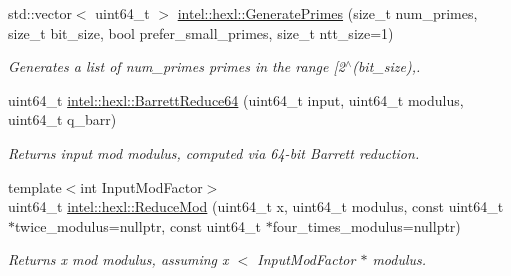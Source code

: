 \begin{DoxyCompactItemize}
std\+::vector$<$ uint64\+\_\+t $>$ \hyperlink{namespaceintel_1_1hexl_a3a8c240e5282f1d89c281527a842ae3d}{intel\+::hexl\+::\+Generate\+Primes} (size\+\_\+t num\+\_\+primes, size\+\_\+t bit\+\_\+size, bool prefer\+\_\+small\+\_\+primes, size\+\_\+t ntt\+\_\+size=1)
\begin{DoxyCompactList}\small\item\em Generates a list of num\+\_\+primes primes in the range \mbox{[}2$^\wedge$(bit\+\_\+size),. \end{DoxyCompactList}\item 
uint64\+\_\+t \hyperlink{namespaceintel_1_1hexl_aebdaa3e2bf7c73ec0dacd465c69f2969}{intel\+::hexl\+::\+Barrett\+Reduce64} (uint64\+\_\+t input, uint64\+\_\+t modulus, uint64\+\_\+t q\+\_\+barr)
\begin{DoxyCompactList}\small\item\em Returns input mod modulus, computed via 64-\/bit Barrett reduction. \end{DoxyCompactList}\item 
{\footnotesize template$<$int Input\+Mod\+Factor$>$ }\\uint64\+\_\+t \hyperlink{namespaceintel_1_1hexl_ab716e0395cbfe58e76f866a9044f2a62}{intel\+::hexl\+::\+Reduce\+Mod} (uint64\+\_\+t x, uint64\+\_\+t modulus, const uint64\+\_\+t $\ast$twice\+\_\+modulus=nullptr, const uint64\+\_\+t $\ast$four\+\_\+times\+\_\+modulus=nullptr)
\begin{DoxyCompactList}\small\item\em Returns x mod modulus, assuming x $<$ Input\+Mod\+Factor $\ast$ modulus. \end{DoxyCompactList}\end{DoxyCompactItemize}

